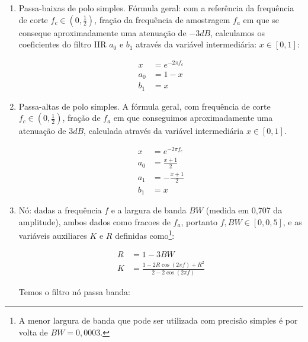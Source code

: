 \begin{enumerate}
\item Passa-baixas de polo simples. Fórmula geral:
com a referência da frequência de corte $f_c \in (0,\frac{1}{2})$,
fração da frequência de amostragem $f_a$
em que se conseque aproximadamente uma atenuação de $-3dB$,
calculamos os coeficientes do filtro IIR
$a_0$ e $b_1$ 
através da variável intermediária: $x \in [0,1]$:

\begin{equation}\label{eq:passa-baixas}
\begin{split}
x & =e^{-2\pi f_c} \\
a_0 & =  1-x \\
b_1 & =  x
\end{split}
\end{equation}

\item Passa-altas de polo simples. A fórmula geral,
com frequência de corte $f_c \in (0,\frac{1}{2})$, fração
de $f_a$ em que conseguimos aproximadamente uma atenuação de $3dB$, calculada através da variável
intermediária $x \in [0,1]$.


\begin{equation}\label{eq:passa-altas}
\begin{split}
x & =e^{-2\pi f_c} \\
a_0 & =  \frac{x+1}{2} \\
a_1 & =  -\frac{x+1}{2} \\
b_1 & =  x
\end{split}
\end{equation}


\item Nó: dadas a frequência $f$ e a largura de banda $BW$ (medida em 0,707 da amplitude),
ambos dados como fracoes de $f_a$, portanto $f,BW \in [0,0,5]$,
e as variáveis auxiliares $K$ e $R$ definidas como\footnote{A menor largura
de banda que pode ser utilizada com precisão simples é por volta de $BW=0,0003$.}:

\begin{equation}
\begin{split}
R & = 1 - 3BW \\
K & = \frac{1-2R\cos(2\pi f) + R^2}{2 - 2 \cos (2 \pi f)}
\end{split}
\end{equation}

Temos o filtro nó passa banda:


\end{enumerate}
